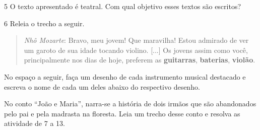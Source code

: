 
\num{5} O texto apresentado é teatral. Com qual objetivo esses textos são
escritos? 



\num{6} Releia o trecho a seguir.

\begin{quote}
\emph{Nhô Mozarte}: Bravo, meu jovem! Que maravilha! Estou admirado de
ver um garoto de sua idade tocando violino. {[}...{]} Os jovens assim
como você, principalmente nos dias de hoje, preferem as
\textbf{guitarras}, \textbf{baterias}, \textbf{violão}.
\end{quote}

\pagebreak
No espaço a seguir, faça um desenho de cada instrumento musical
destacado e escreva o nome de cada um deles abaixo do respectivo desenho.

\begin{mdframed}[linewidth=2pt,linecolor=salmao,roundcorner=20pt]
\vspace{10cm}
\end{mdframed}

No conto ``João e Maria'', narra-se a história de dois irmãos que são
abandonados pelo pai e pela madrasta na floresta. Leia um trecho desse
conto e resolva as atividade de 7 a 13.


